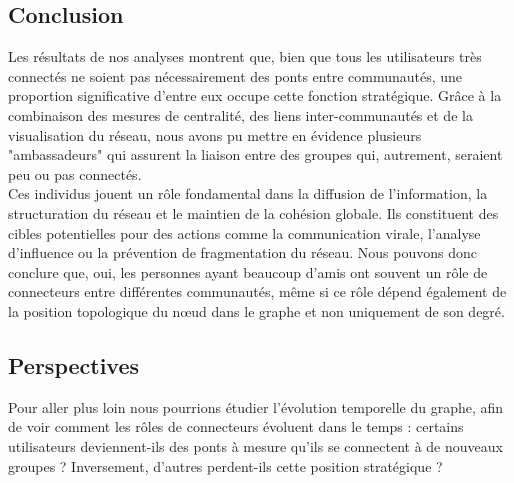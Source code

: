 \documentclass[a4paper, 12pt, twoside]{article}
\begin{document}
	\subsection{Conclusion}
    Les résultats de nos analyses montrent que, bien que tous les utilisateurs très connectés ne soient pas nécessairement des ponts entre communautés, une proportion significative d’entre eux occupe cette fonction stratégique. Grâce à la combinaison des mesures de centralité, des liens inter-communautés et de la visualisation du réseau, nous avons pu mettre en évidence plusieurs "ambassadeurs" qui assurent la liaison entre des groupes qui, autrement, seraient peu ou pas connectés.\\

Ces individus jouent un rôle fondamental dans la diffusion de l’information, la structuration du réseau et le maintien de la cohésion globale. Ils constituent des cibles potentielles pour des actions comme la communication virale, l’analyse d’influence ou la prévention de fragmentation du réseau.
Nous pouvons donc conclure que, oui, les personnes ayant beaucoup d’amis ont souvent un rôle de connecteurs entre différentes communautés, même si ce rôle dépend également de la position topologique du nœud dans le graphe et non uniquement de son degré.
	\subsection{Perspectives}
    Pour aller plus loin nous pourrions étudier l’évolution temporelle du graphe, afin de voir comment les rôles de connecteurs évoluent dans le temps : certains utilisateurs deviennent-ils des ponts à mesure qu’ils se connectent à de nouveaux groupes ? Inversement, d’autres perdent-ils cette position stratégique ? 
	


\newpage

\end{document}
